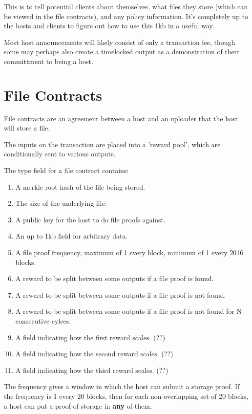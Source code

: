 \documentclass[twocolumn]{article}
\begin{document}
This is to tell potential clients about themselves, what files they store (which can be viewed in the file contracts), and any policy information.
It's completely up to the hosts and clients to figure out how to use this 1kb in a useful way.

Most host announcements will likely consist of only a transaction fee, though some may perhaps also create a timelocked output as a demonstration of their committment to being a host.

\section{File Contracts}
File contracts are an agreement between a host and an uploader that the host will store a file.

The inputs on the transaction are placed into a 'reward pool', which are conditionally sent to various outputs.

The type field for a file contract contains:
\begin{enumerate}
	\item A merkle root hash of the file being stored.
	\item The size of the underlying file.
	\item A public key for the host to do file proofs against.
	\item An up to 1kb field for arbitrary data.
	\item A file proof frequency, maximum of 1 every block, minimum of 1 every 2016 blocks.
	\item A reward to be split between some outputs if a file proof is found.
	\item A reward to be split between some outputs if a file proof is not found.
	\item A reward to be split between some outputs if a file proof is not found for N consecutive cylces.
	\item A field indicating how the first reward scales. (??)
	\item A field indicating how the second reward scales. (??)
	\item A field indicating how the third reward scales. (??)
\end{enumerate}

The frequency gives a window in which the host can submit a storage proof.
If the frequency is 1 every 20 blocks, then for each non-overlapping set of 20 blocks, a host can put a proof-of-storage in \textbf{any} of them.
\end{document}
